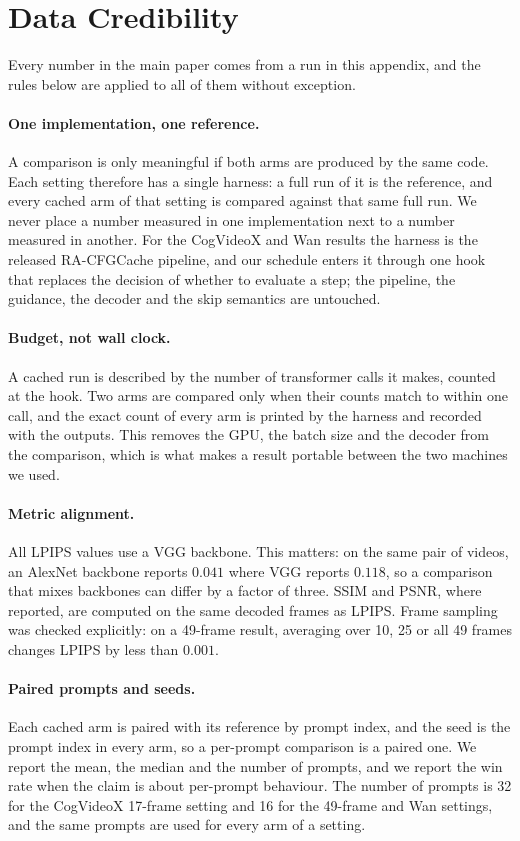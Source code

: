 \section{Data Credibility}
\label{app:credibility}

Every number in the main paper comes from a run in this appendix, and the rules below are applied to all of them without exception.

\paragraph{One implementation, one reference.} A comparison is only meaningful if both arms are produced by the same code. Each setting therefore has a single harness: a full run of it is the reference, and every cached arm of that setting is compared against that same full run. We never place a number measured in one implementation next to a number measured in another. For the CogVideoX and Wan results the harness is the released RA-CFGCache pipeline, and our schedule enters it through one hook that replaces the decision of whether to evaluate a step; the pipeline, the guidance, the decoder and the skip semantics are untouched.

\paragraph{Budget, not wall clock.} A cached run is described by the number of transformer calls it makes, counted at the hook. Two arms are compared only when their counts match to within one call, and the exact count of every arm is printed by the harness and recorded with the outputs. This removes the GPU, the batch size and the decoder from the comparison, which is what makes a result portable between the two machines we used.

\paragraph{Metric alignment.} All LPIPS values use a VGG backbone. This matters: on the same pair of videos, an AlexNet backbone reports $0.041$ where VGG reports $0.118$, so a comparison that mixes backbones can differ by a factor of three. SSIM and PSNR, where reported, are computed on the same decoded frames as LPIPS. Frame sampling was checked explicitly: on a 49-frame result, averaging over 10, 25 or all 49 frames changes LPIPS by less than $0.001$.

\paragraph{Paired prompts and seeds.} Each cached arm is paired with its reference by prompt index, and the seed is the prompt index in every arm, so a per-prompt comparison is a paired one. We report the mean, the median and the number of prompts, and we report the win rate when the claim is about per-prompt behaviour. The number of prompts is 32 for the CogVideoX 17-frame setting and 16 for the 49-frame and Wan settings, and the same prompts are used for every arm of a setting.

